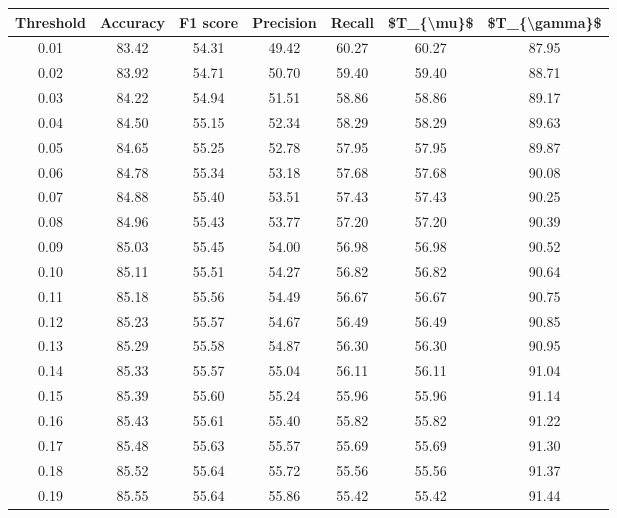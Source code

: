 \begin{tabular}{|c|c|c|c|c|c|c|}
\hline
 Threshold &  Accuracy &  F1 score &  Precision &  Recall &  \$T\_\{\textbackslash mu\}\$ &  \$T\_\{\textbackslash gamma\}\$ \\
\hline
      0.01 &     83.42 &     54.31 &      49.42 &   60.27 &      60.27 &         87.95 \\
      0.02 &     83.92 &     54.71 &      50.70 &   59.40 &      59.40 &         88.71 \\
      0.03 &     84.22 &     54.94 &      51.51 &   58.86 &      58.86 &         89.17 \\
      0.04 &     84.50 &     55.15 &      52.34 &   58.29 &      58.29 &         89.63 \\
      0.05 &     84.65 &     55.25 &      52.78 &   57.95 &      57.95 &         89.87 \\
      0.06 &     84.78 &     55.34 &      53.18 &   57.68 &      57.68 &         90.08 \\
      0.07 &     84.88 &     55.40 &      53.51 &   57.43 &      57.43 &         90.25 \\
      0.08 &     84.96 &     55.43 &      53.77 &   57.20 &      57.20 &         90.39 \\
      0.09 &     85.03 &     55.45 &      54.00 &   56.98 &      56.98 &         90.52 \\
      0.10 &     85.11 &     55.51 &      54.27 &   56.82 &      56.82 &         90.64 \\
      0.11 &     85.18 &     55.56 &      54.49 &   56.67 &      56.67 &         90.75 \\
      0.12 &     85.23 &     55.57 &      54.67 &   56.49 &      56.49 &         90.85 \\
      0.13 &     85.29 &     55.58 &      54.87 &   56.30 &      56.30 &         90.95 \\
      0.14 &     85.33 &     55.57 &      55.04 &   56.11 &      56.11 &         91.04 \\
      0.15 &     85.39 &     55.60 &      55.24 &   55.96 &      55.96 &         91.14 \\
      0.16 &     85.43 &     55.61 &      55.40 &   55.82 &      55.82 &         91.22 \\
      0.17 &     85.48 &     55.63 &      55.57 &   55.69 &      55.69 &         91.30 \\
      0.18 &     85.52 &     55.64 &      55.72 &   55.56 &      55.56 &         91.37 \\
      0.19 &     85.55 &     55.64 &      55.86 &   55.42 &      55.42 &         91.44 \\

\end{tabular}
